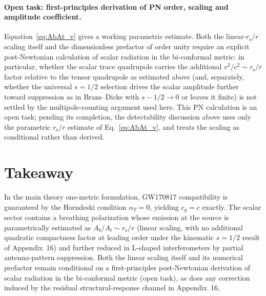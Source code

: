 \documentclass[11pt]{article}
\newcommand{\rs}{r_{\mathrm{s}}}
\begin{document}
\paragraph{Open task: first-principles derivation of PN order, scaling and amplitude coefficient.}
Equation~\eqref{eq:AbAt_v} gives a working parametric estimate. Both the linear-$\rs/r$ scaling itself and the dimensionless prefactor of order unity require an explicit post-Newtonian calculation of scalar radiation in the bi-conformal metric: in particular, whether the scalar trace quadrupole carries the additional $v^2/c^2\sim\rs/r$ factor relative to the tensor quadrupole as estimated above (and, separately, whether the universal $s=1/2$ selection drives the scalar amplitude further toward suppression as in Brans--Dicke with $s-1/2\to 0$ or leaves it finite) is not settled by the multipole-counting argument used here. This PN calculation is an open task; pending its completion, the detectability discussion above uses only the parametric $\rs/r$ estimate of Eq.~\eqref{eq:AbAt_v}, and treats the scaling as conditional rather than derived.

\section*{Takeaway}
In the main theory one-metric formulation, GW170817 compatibility is guaranteed by the Horndeski condition $\alpha_T=0$, yielding $c_g=c$ exactly. The scalar sector contains a breathing polarization whose emission at the source is parametrically estimated as $A_b/A_t\sim \rs/r$ (linear scaling, with no additional quadratic compactness factor at leading order under the kinematic $s=1/2$ result of Appendix~16) and further reduced in L-shaped interferometers by partial antenna-pattern suppression. Both the linear scaling itself and its numerical prefactor remain conditional on a first-principles post-Newtonian derivation of scalar radiation in the bi-conformal metric (open task), as does any correction induced by the residual structural-response channel in Appendix~16.
\end{document}
